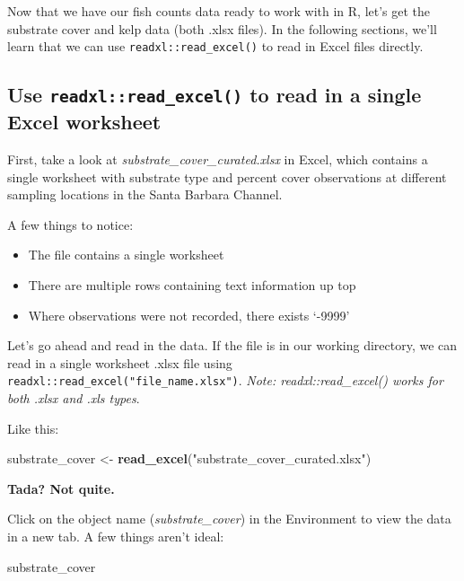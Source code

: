 \documentclass[]{book}
\newenvironment{Shaded}{\begin{snugshade}}{\end{snugshade}}
\newcommand{\KeywordTok}[1]{\textcolor[rgb]{0.13,0.29,0.53}{\textbf{#1}}}
\newcommand{\NormalTok}[1]{#1}
\newcommand{\StringTok}[1]{\textcolor[rgb]{0.31,0.60,0.02}{#1}}
\providecommand{\tightlist}{%
  \setlength{\itemsep}{0pt}\setlength{\parskip}{0pt}}
\begin{document}
Now that we have our fish counts data ready to work with in R, let's get the substrate cover and kelp data (both .xlsx files). In the following sections, we'll learn that we can use \texttt{readxl::read\_excel()} to read in Excel files directly.

\hypertarget{use-readxlread_excel-to-read-in-a-single-excel-worksheet}{%
\subsection{\texorpdfstring{Use \texttt{readxl::read\_excel()} to read in a single Excel worksheet}{Use readxl::read\_excel() to read in a single Excel worksheet}}\label{use-readxlread_excel-to-read-in-a-single-excel-worksheet}}

First, take a look at \emph{substrate\_cover\_curated.xlsx} in Excel, which contains a single worksheet with substrate type and percent cover observations at different sampling locations in the Santa Barbara Channel.

A few things to notice:

\begin{itemize}
\tightlist
\item
  The file contains a single worksheet
\item
  There are multiple rows containing text information up top
\item
  Where observations were not recorded, there exists `-9999'
\end{itemize}

Let's go ahead and read in the data. If the file is in our working directory, we can read in a single worksheet .xlsx file using \texttt{readxl::read\_excel("file\_name.xlsx")}. \emph{Note: readxl::read\_excel() works for both .xlsx and .xls types}.

Like this:

\begin{Shaded}
\begin{Highlighting}[]
\NormalTok{substrate_cover <-}\StringTok{ }\KeywordTok{read_excel}\NormalTok{(}\StringTok{"substrate_cover_curated.xlsx"}\NormalTok{)}
\end{Highlighting}
\end{Shaded}

\textbf{Tada? Not quite.}

Click on the object name (\emph{substrate\_cover}) in the Environment to view the data in a new tab. A few things aren't ideal:

\begin{Shaded}
\begin{Highlighting}[]
\NormalTok{substrate_cover}
\end{Highlighting}
\end{Shaded}
\end{document}
